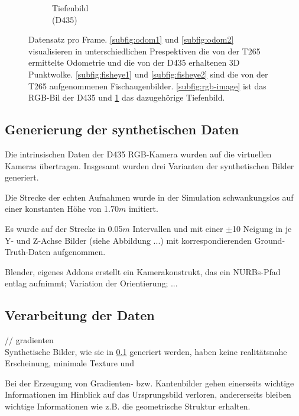 \begin{figure}[H]
\begin{subfigure}[b]{0.3\linewidth}
		\caption{Tiefenbild \\ (D435) \hspace*{2cm}}
		\label{subfig:depth-image}
	\end{subfigure}
	\caption{Datensatz pro Frame. \ref{subfig:odom1}  und \ref{subfig:odom2} visualisieren in unterschiedlichen Prespektiven die von der T265 ermittelte Odometrie und die von der D435 erhaltenen 3D Punktwolke. \ref{subfig:fisheye1} und \ref{subfig:fisheye2} sind die von der T265 aufgenommenen Fischaugenbilder. \ref{subfig:rgb-image} ist das RGB-Bil der D435 und \ref{subfig:depth-image} das dazugehörige Tiefenbild. }
	\label{fig:dataset}
\end{figure}


\subsection{Generierung der synthetischen Daten}
\label{subsec:generate_synth_images}

Die intrinsischen Daten der D435 RGB-Kamera wurden auf die virtuellen Kameras übertragen. 
Insgesamt wurden drei Varianten der synthetischen Bilder generiert. 

Die Strecke der echten Aufnahmen wurde in der Simulation schwankungslos auf einer konstanten Höhe von 1.70$m$ imitiert.

Es wurde auf der Strecke in 0.05$m$ Intervallen und mit einer $\pm$10\° Neigung in je Y- und Z-Achse Bilder (siehe Abbildung ...) mit korrespondierenden Ground-Truth-Daten aufgenommen. 

Blender,
eigenes Addons erstellt ein Kamerakonstrukt, das ein NURBs-Pfad entlag aufnimmt; Variation der Orientierung; ...


\subsection{Verarbeitung der Daten}
// gradienten\\

Synthetische Bilder, wie sie in  \ref{subsec:generate_synth_images} generiert werden, haben keine realitätsnahe Erscheinung, minimale Texture und 


Bei der Erzeugung von Gradienten- bzw. Kantenbilder gehen einerseits wichtige Informationen im Hinblick auf das Ursprungsbild verloren, andererseits bleiben wichtige Informationen wie z.B. die geometrische Struktur erhalten.


